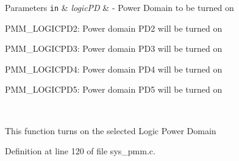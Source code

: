 \begin{DoxyParams}[1]{Parameters}
\mbox{\tt in}  & {\em logic\+PD} & -\/ Power Domain to be turned on
\begin{DoxyItemize}
\item P\+M\+M\+\_\+\+L\+O\+G\+I\+C\+P\+D2\+: Power domain P\+D2 will be turned on
\item P\+M\+M\+\_\+\+L\+O\+G\+I\+C\+P\+D3\+: Power domain P\+D3 will be turned on
\item P\+M\+M\+\_\+\+L\+O\+G\+I\+C\+P\+D4\+: Power domain P\+D4 will be turned on
\item P\+M\+M\+\_\+\+L\+O\+G\+I\+C\+P\+D5\+: Power domain P\+D5 will be turned on
\end{DoxyItemize}\\
\hline
\end{DoxyParams}
This function turns on the selected Logic Power Domain 

Definition at line 120 of file sys\+\_\+pmm.\+c.


